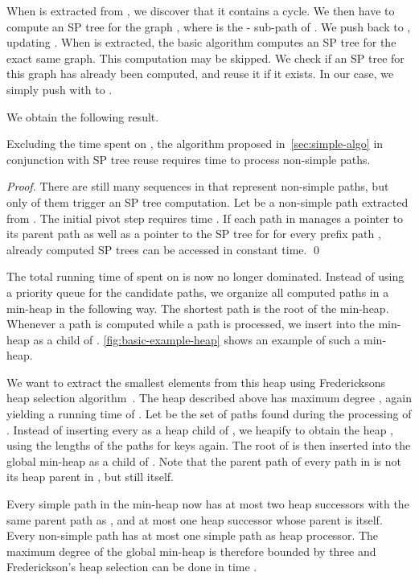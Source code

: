 \documentclass[runningheads,a4paper]{llncs}
\begin{document}
When  is extracted from , we discover that it contains a cycle.
We then have to compute an SP tree  for the graph , where  is the - sub-path of .
We push  back to , updating .
When  is extracted, the basic algorithm computes an SP tree for the exact same graph.
This computation may be skipped.
We check if an SP tree for this graph has already been computed, and reuse it if it exists.
In our case, we simply push  with  to .

We obtain the following result.

\begin{lemma}
    Excluding the time spent on , the algorithm proposed in~\autoref{sec:simple-algo} in conjunction with SP tree reuse requires  time to process non-simple paths.
\end{lemma}
\begin{proof}
    There are still  many sequences in  that represent non-simple paths, but only  of them trigger an SP tree computation.
    Let  be a non-simple path extracted from .
    The initial pivot step requires time .
    If each path in  manages a pointer to its parent path as well as a pointer to the SP tree for  for every prefix path , already computed SP trees can be accessed in constant time.
    \qed
\end{proof}

The total running time of  spent on  is now no longer dominated.
Instead of using a priority queue for the candidate paths, we organize all computed paths in a min-heap in the following way.
The shortest path is the root of the min-heap.
Whenever a path  is computed while a path  is processed, we insert  into the min-heap as a child of .
\autoref{fig:basic-example-heap} shows an example of such a min-heap.

We want to extract the  smallest elements from this heap using Fredericksons heap selection algorithm~\cite{DBLP:journals/iandc/Frederickson93}.
The heap described above has maximum degree , again yielding a running time of .
Let  be the set of paths found during the processing of .
Instead of inserting every  as a heap child of , we heapify  to obtain the heap , using the lengths of the paths for keys again.
The root of  is then inserted into the global min-heap as a child of .
Note that the parent path of every path in  is not its heap parent in , but still  itself.

Every simple path  in the min-heap now has at most two heap successors with the same parent path as , and at most one heap successor whose parent is  itself.
Every non-simple path has at most one simple path as heap processor.
The maximum degree of the global min-heap is therefore bounded by three and Frederickson's heap selection can be done in time .
\end{document}
